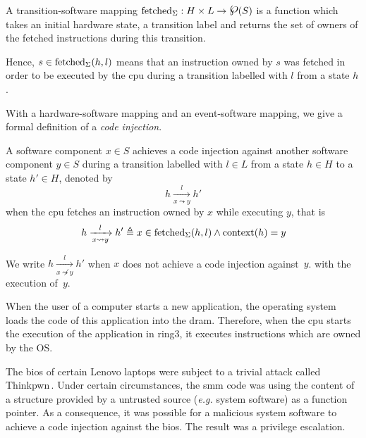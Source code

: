 \begin{definition}
  \label{def:minx86:transsoft}
  A transition-software mapping
  $\func{fetched}_{\Sigma}: H \times L \rightarrow \powerset(S)$ is a function
  which takes an initial hardware state, a transition label and returns the set
  of owners of the fetched instructions during this transition.
\end{definition}

Hence, $s \in \mathrm{fetched}_{\Sigma}(h, l)$ means that an instruction owned by
$s$ was fetched in order to be executed by the \ac{cpu} during a transition
labelled with $l$ from a state $h$.

With a hardware-software mapping and an event-software mapping, we give a formal
definition of a \textit{code injection}.

\begin{definition}
  \label{def:speccert:tempering}
  A software component $x \in S$ achieves a code injection against another
  software component $y \in S$ during a transition labelled with $l \in L$ from
  a state $h \in H$ to a state $h' \in H$, denoted by
  \[
    h \xrightarrow[x \leadsto y]{l} h'
  \]
  when the \ac{cpu} fetches an instruction owned by $x$ while executing $y$,
  that is
  \[
    h \xrightarrow[x \leadsto y]{l} h' \triangleq x \in
    \mathrm{fetched}_{\Sigma}(h, l) \wedge \mathrm{context}(h) = y
  \]

  We write $h \xrightarrow[x \not\leadsto y]{l} h'$ when $x$ does not achieve a
  code injection against~$y$.  with the execution of~$y$.
\end{definition}

\begin{example}
  When the user of a computer starts a new application, the operating system
  loads the code of this application into the \ac{dram}. Therefore, when the
  \ac{cpu} starts the execution of the application in ring3, it executes
  instructions which are owned by the OS.
\end{example}

\begin{example}
  The \ac{bios} of certain Lenovo laptops were subject to a trivial attack
  called Thinkpwn\,\cite{cr4sh2016thinkpwn}.
  Under certain circumstances, the \ac{smm} code was using the content of a
  structure provided by a untrusted source (\emph{e.g.} system software) as a
  function pointer.
  As a consequence, it was possible for a malicious system software to achieve a
  code injection against the \ac{bios}.
  The result was a privilege escalation.
\end{example}


